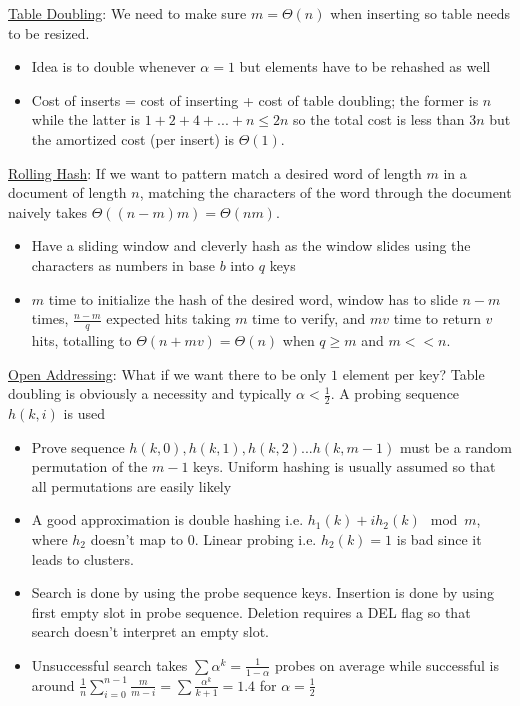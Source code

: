 \documentclass{article}
\begin{document}
\vspace{-1mm}
\underline{Table Doubling}: We need to make sure $m=\Theta(n)$ when inserting so table needs to be resized. 
\vspace{-1mm}
\begin{itemize}
\item Idea is to double whenever $\alpha = 1$ but elements have to be rehashed as well
\item Cost of inserts = cost of inserting + cost of table doubling; the former is $n$ while the latter is $1+2+4+...+n\leq 2n$ so the total cost is less than $3n$ but the amortized cost (per insert) is $\Theta(1)$.
\end{itemize}
\vspace{-1mm}
\underline{Rolling Hash}: If we want to pattern match a desired word of length $m$ in a document of length $n$, matching the characters of the word through the document naively takes $\Theta((n-m)m)=\Theta(nm)$.
\vspace{-1mm}
\begin{itemize}
\item Have a sliding window and cleverly hash as the window slides using the characters as numbers in base $b$ into $q$ keys
\item $m$ time to initialize the hash of the desired word, window has to slide $n-m$ times, $\frac{n-m}{q}$ expected hits taking $m$ time to verify, and $mv$ time to return $v$ hits, totalling to $\Theta(n+mv)=\Theta(n)$ when $q\geq m$ and $m<< n$.
\end{itemize}
\vspace{-1mm}
\underline{Open Addressing}: What if we want there to be only $1$ element per key? Table doubling is obviously a necessity and typically $\alpha < \frac{1}{2}$. A probing sequence $h(k, i)$ is used
\vspace{-1mm}
\begin{itemize}
\item Prove sequence $h(k,0), h(k,1), h(k,2)...h(k, m-1)$ must be a random permutation of the $m-1$ keys. Uniform hashing is usually assumed so that all permutations are easily likely
\item A good approximation is double hashing i.e. $h_1 (k) + i h_2(k)\mod m$, where $h_2$ doesn't map to $0$. Linear probing i.e. $h_2(k)=1$ is bad since it leads to clusters.
\item Search is done by using the probe sequence keys. Insertion is done by using first empty slot in probe sequence. Deletion requires a DEL flag so that search doesn't interpret an empty slot.
\item Unsuccessful search takes $\sum \alpha^k=\frac{1}{1-\alpha}$ probes on average while successful is around $\frac{1}{n}\displaystyle\sum_{i=0}^{n-1} \frac{m}{m-i}=\sum \frac{\alpha^k}{k+1}=1.4$ for $\alpha=\frac{1}{2}$
\end{itemize}
\end{document}
